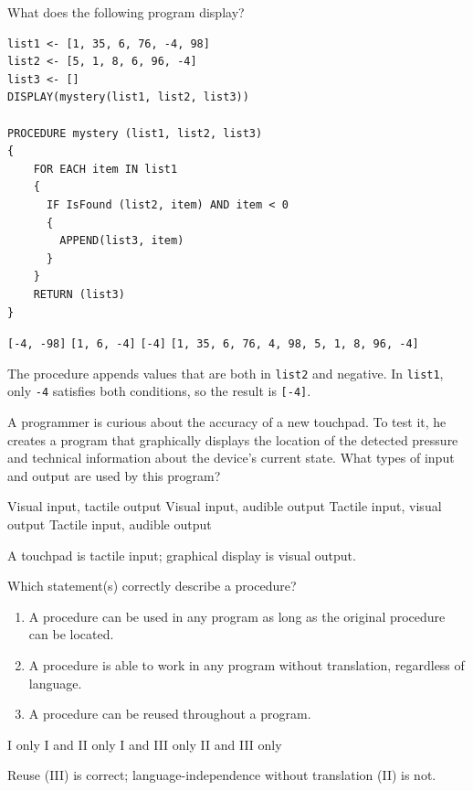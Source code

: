 \newpage

\question[5]
What does the following program display?
\begin{lstlisting}[style=pseudo]
list1 <- [1, 35, 6, 76, -4, 98]
list2 <- [5, 1, 8, 6, 96, -4]
list3 <- []
DISPLAY(mystery(list1, list2, list3))

PROCEDURE mystery (list1, list2, list3)
{
    FOR EACH item IN list1
    {
      IF IsFound (list2, item) AND item < 0
      {
        APPEND(list3, item)
      }
    }
    RETURN (list3)
}
\end{lstlisting}

\begin{choices}
  \choice \texttt{[-4, -98]}
  \choice \texttt{[1, 6, -4]}
  \CorrectChoice \texttt{[-4]}
  \choice \texttt{[1, 35, 6, 76, 4, 98, 5, 1, 8, 96, -4]}
\end{choices}
\begin{solution}
  The procedure appends values that are both in \texttt{list2} and negative. In \texttt{list1}, only \texttt{-4} satisfies both conditions, so the result is \texttt{[-4]}.
\end{solution}


\question[5]
A programmer is curious about the accuracy of a new touchpad. To test it, he creates a program that graphically displays the location of the detected pressure and technical information about the device's current state. What types of input and output are used by this program?
\begin{choices}
  \choice Visual input, tactile output
  \choice Visual input, audible output
  \CorrectChoice Tactile input, visual output
  \choice Tactile input, audible output
\end{choices}
\begin{solution}
  A touchpad is tactile input; graphical display is visual output.
\end{solution}

\newpage

\question[5]
Which statement(s) correctly describe a procedure?
\begin{enumerate}
  \renewcommand{\labelenumi}{\Roman{enumi}.}
  \item A procedure can be used in any program as long as the original procedure can be located.
  \item A procedure is able to work in any program without translation, regardless of language.
  \item A procedure can be reused throughout a program.
\end{enumerate}
\begin{choices}
  \choice I only
  \choice I and II only
  \CorrectChoice I and III only
  \choice II and III only
\end{choices}
\begin{solution}
  Reuse (III) is correct; language-independence without translation (II) is not.
\end{solution}

